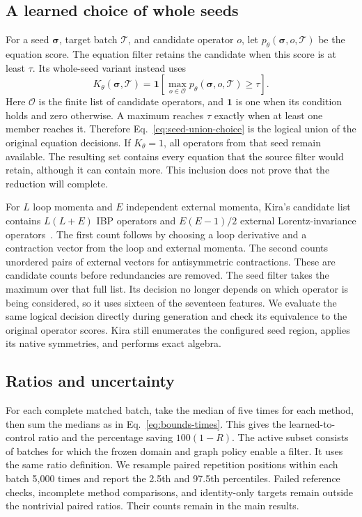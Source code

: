 \subsection{A learned choice of whole seeds}
For a seed $\boldsymbol\sigma$, target batch $\mathcal T$, and candidate operator $o$, let $p_\theta(\boldsymbol\sigma,o,\mathcal T)$ be the equation score. The equation filter retains the candidate when this score is at least $\tau$. Its whole-seed variant instead uses
\begin{equation}
 K_\theta(\boldsymbol\sigma,\mathcal T)
 =\mathbf 1\!\left[\max_{o\in\mathcal O}p_\theta(\boldsymbol\sigma,o,\mathcal T)\geq\tau\right].
 \label{eq:seed-union-choice}
\end{equation}
Here $\mathcal O$ is the finite list of candidate operators, and $\mathbf 1$ is one when its condition holds and zero otherwise. A maximum reaches $\tau$ exactly when at least one member reaches it. Therefore Eq.~\eqref{eq:seed-union-choice} is the logical union of the original equation decisions. If $K_\theta=1$, all operators from that seed remain available. The resulting set contains every equation that the source filter would retain, although it can contain more. This inclusion does not prove that the reduction will complete.

For $L$ loop momenta and $E$ independent external momenta, Kira's candidate list contains $L(L+E)$ IBP operators and $E(E-1)/2$ external Lorentz-invariance operators~\cite{KiraOriginal}. The first count follows by choosing a loop derivative and a contraction vector from the loop and external momenta. The second counts unordered pairs of external vectors for antisymmetric contractions. These are candidate counts before redundancies are removed. The seed filter takes the maximum over that full list. Its decision no longer depends on which operator is being considered, so it uses sixteen of the seventeen features. We evaluate the same logical decision directly during generation and check its equivalence to the original operator scores. Kira still enumerates the configured seed region, applies its native symmetries, and performs exact algebra.

\subsection{Ratios and uncertainty}
For each complete matched batch, take the median of five times for each method, then sum the medians as in Eq.~\eqref{eq:bounds-times}. This gives the learned-to-control ratio and the percentage saving $100(1-R)$. The active subset consists of batches for which the frozen domain and graph policy enable a filter. It uses the same ratio definition. We resample paired repetition positions within each batch 5,000 times and report the 2.5th and 97.5th percentiles. Failed reference checks, incomplete method comparisons, and identity-only targets remain outside the nontrivial paired ratios. Their counts remain in the main results.

